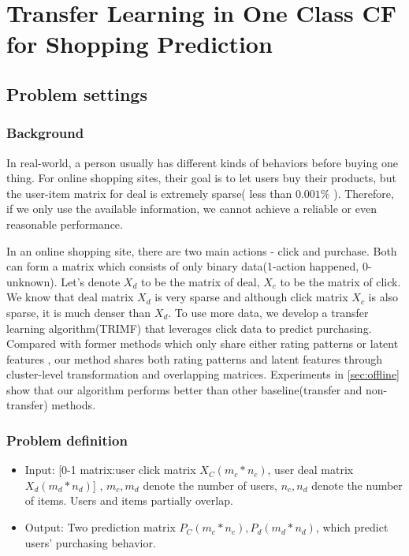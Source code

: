 \chapter{Transfer Learning in One Class CF for Shopping Prediction}
\label{chp:trimf}
\section{Problem settings}
\subsection{Background}
\par{
In real-world, a person usually has different kinds of behaviors before buying one thing. For online shopping sites, their goal is to let users buy their products, but the user-item matrix for deal is extremely sparse( less than $0.001\%$ ). Therefore, if we only use the available information, we cannot achieve a reliable or even reasonable performance.

In an online shopping site, there are two main actions - click and purchase. Both can form a matrix which consists of only binary data(1-action happened, 0-unknown). Let's denote $X_d$ to be the matrix of deal, $X_c$ to be the matrix of click. We know that deal matrix $X_d$ is very sparse and although click matrix $X_c$ is also sparse, it is much denser than $X_d$. To use more data, we develop a transfer learning algorithm(TRIMF) that leverages click data to predict purchasing. Compared with former methods which only share either rating patterns or latent features , our method shares both rating patterns and latent features through cluster-level transformation and overlapping matrices. Experiments in \ref{sec:offline} show that our algorithm performs better than other baseline(transfer and non-transfer) methods.}

\subsection{Problem definition}
  \begin{itemize}
  \item Input: [0-1 matrix:user click matrix $X_C(m_c*n_c)$, user deal matrix $X_d(m_d*n_d)$] , $m_c, m_d$ denote the number of users, $n_c, n_d$ denote the number of items. Users and items partially overlap.
  \item Output: Two prediction matrix $P_C(m_c*n_c), P_d(m_d*n_d)$, which predict users' purchasing behavior.
  \end{itemize}



